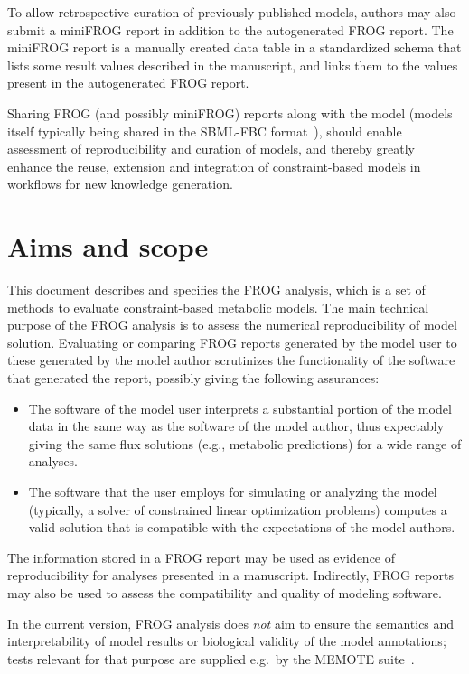 To allow retrospective curation of previously published models, authors may also submit a miniFROG report in addition to the autogenerated FROG report.
The miniFROG report is a manually created data table in a standardized schema that lists some result values described in the manuscript, and links them to the values present in the autogenerated FROG report.

Sharing FROG (and possibly miniFROG) reports along with the model (models itself typically being shared in the SBML-FBC format~\cite{olivier2018sbmlfbc}), should enable assessment of reproducibility and curation of models, and thereby greatly enhance the reuse, extension and integration of constraint-based models in workflows for new knowledge generation.

\section{Aims and scope}
\label{sec:aims}

This document describes and specifies the FROG analysis, which is a set of methods to evaluate constraint-based metabolic models.
The main technical purpose of the FROG analysis is to assess the numerical reproducibility of model solution.
Evaluating or comparing FROG reports generated by the model user to these generated by the model author scrutinizes the functionality of the software that generated the report, possibly giving the following assurances:
\begin{itemize}
\item The software of the model user interprets a substantial portion of the model data in the same way as the software of the model author, thus expectably giving the same flux solutions (e.g., metabolic predictions) for a wide range of analyses.
\item The software that the user employs for simulating or analyzing the model (typically, a solver of constrained linear optimization problems) computes a valid solution that is compatible with the expectations of the model authors.
\end{itemize}

The information stored in a FROG report may be used as evidence of reproducibility for analyses presented in a manuscript.
Indirectly, FROG reports may also be used to assess the compatibility and quality of modeling software.

In the current version, FROG analysis does \emph{not} aim to ensure the semantics and interpretability of model results or biological validity of the model annotations; tests relevant for that purpose are supplied e.g.~by the MEMOTE suite~\cite{lieven2020memote}.

